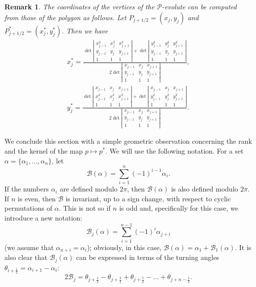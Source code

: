 \documentclass[12pt]{article}
\newtheorem{remark}[lemma]{Remark}
\newcommand{\B}{\mathcal{B}}
\newcommand{\Pev}{\mathcal{P}}
\begin{document}
\begin{remark}
{\rm 
The coordinates of the vertices of the $\Pev$-evolute can be computed from those of the polygon as follows. Let $P_{j+1/2} = (x_j, y_j)$ and $P^*_{j+1/2} = (x^*_j, y^*_j)$. Then we have
\begin{equation*}
\begin{split}
x_j^* = \frac{\det\left|\begin{array}{ccc} x_{j-1}^2 & x_j^2 & x_{j+1}^2 \\ y_{j-1} & y_j & y_{j+1} \\ 1 & 1 & 1\end{array}\right| + \det\left|\begin{array}{ccc} y_{j-1}^2 & y_j^2 & y_{j+1}^2 \\ y_{j-1} & y_j & y_{j+1} \\ 1 & 1 & 1 \end{array}\right|} {2 \det\left|\begin{array}{ccc} x_{j-1} & x_j & x_{j+1} \\ y_{j-1} & y_j & y_{j+1} \\ 1 & 1 & 1 \end{array}\right|}, \\
y_j^* = \frac{\det\left|\begin{array}{ccc} x_{j-1} & x_j & x_{j+1} \\ x_{j-1}^2 & x_j^2 & x_{j+1}^2 \\ 1 & 1 & 1 \end{array}\right| + \det\left|\begin{array}{ccc} x_{j-1} & x_j & x_{j+1} \\ y_{j-1}^2 & y_j^2 & y_{j+1}^2 \\ 1 & 1 & 1\end{array}\right|} {2 \det\left|\begin{array}{ccc} x_{j-1} & x_j & x_{j+1} \\ y_{j-1} & y_j & y_{j+1} \\ 1 & 1 & 1\end{array}\right|}.
\end{split}
\end{equation*}
}
\end{remark}

We conclude this section with a simple geometric observation concerning the rank and the kernel of the map $p\mapsto p^\ast$. We will use the following notation. For a set $\alpha=\{\alpha_1,\dots,\alpha_n\}$, let$$\B(\alpha)=\sum_{i=1}^n(-1)^{i-1}\alpha_i.$$If the numbers $\alpha_i$ are defined modulo $2\pi$, then $\B(\alpha)$ is also defined modulo $2\pi$. If $n$ is even, then $\B$ is invariant, up to a sign change, with respect to cyclic permutations of $\alpha$. This is not so if $n$ is odd and, specifically for this case, we introduce a new notation:
$$\B_j(\alpha)=\sum_{i=1}^{n-1}(-1)^i\alpha_{j+i}$$
(we assume that $\alpha_{n+i}=\alpha_i$); obviously, in this case, $\B(\alpha)=\alpha_1+\B_1(\alpha)$. It is also clear that $\B_j(\alpha)$ can be expressed in terms of the turning angles $\theta_{i+\frac12}=\alpha_{i+1}-\alpha_i$:$$2\B_j=\theta_{j+\frac12}-\theta_{j+\frac32}+\theta_{j+\frac52}-\dots+\theta_{j+n-\frac12}.$$
\end{document}
